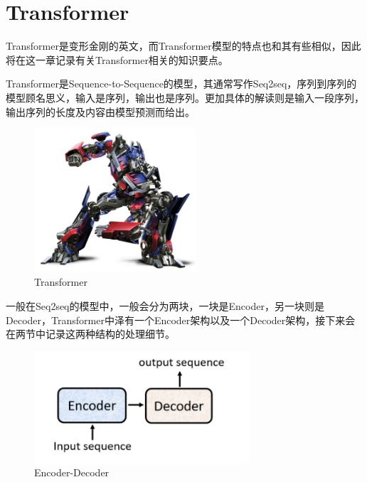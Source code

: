 \documentclass{article}
\begin{document}
\section{Transformer}
\indent Transformer是变形金刚的英文，而Transformer模型的特点也和其有些相似，因此将在这一章记录有关Transformer相关的知识要点。 \par
\indent Transformer是Sequence-to-Sequence的模型，其通常写作Seq2seq，序列到序列的模型顾名思义，输入是序列，输出也是序列。更加具体的解读则是输入一段序列，输出序列的长度及内容由模型预测而给出。\par
\begin{figure}[H]
    \centering
    \includegraphics[width=6cm]{picture/Transformers.png}
    \caption{Transformer}
    \label{fig:galxy}
\end{figure}
\indent 一般在Seq2seq的模型中，一般会分为两块，一块是Encoder，另一块则是Decoder，Transformer中泽有一个Encoder架构以及一个Decoder架构，接下来会在两节中记录这两种结构的处理细节。 \par
\begin{figure}[H]
    \centering
    \includegraphics[width=8cm]{picture/EDcoder.png}
    \caption{Encoder-Decoder}
    \label{fig:galxy}
\end{figure}
\end{document}
